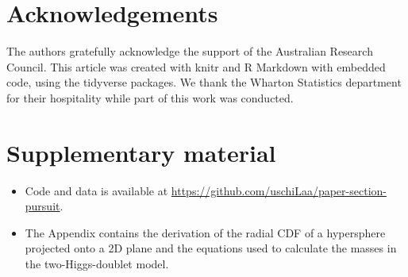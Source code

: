 \documentclass[]{interact}
\theoremstyle{plain}%
\theoremstyle{definition}
\theoremstyle{remark}
\def\tightlist{}
\begin{document}
\hypertarget{acknowledgements}{%
\section*{Acknowledgements}\label{acknowledgements}}

The authors gratefully acknowledge the support of the Australian
Research Council. This article was created with knitr \citep{knitr} and
R Markdown \citep{rmarkdown} with embedded code, using the tidyverse
\citep{tidyverse} packages. We thank the Wharton Statistics department
for their hospitality while part of this work was conducted.

\hypertarget{supplementary-material}{%
\section*{Supplementary material}\label{supplementary-material}}

\begin{itemize}
\tightlist
\item
  Code and data is available at
  \url{https://github.com/uschiLaa/paper-section-pursuit}.
\item
  The Appendix contains the derivation of the radial CDF of a
  hypersphere projected onto a 2D plane and the equations used to
  calculate the masses in the two-Higgs-doublet model.
\end{itemize}






\end{document}
